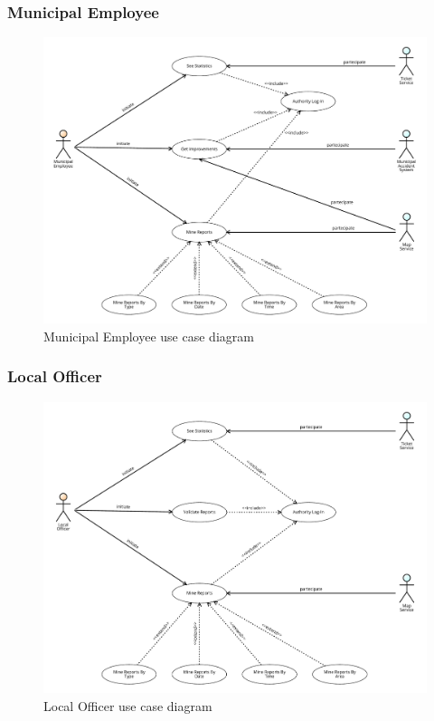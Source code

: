 				\subsubsection{Municipal Employee}
					\vspace{-7mm}
					\begin{figure}[!h]
						\centering
						\includegraphics[width=\textwidth]{images/UseCase/ME.pdf}
						\caption{Municipal Employee use case diagram}
					\end{figure}
				\subsubsection{Local Officer}
				\vspace{-7mm}
					\begin{figure}[!h]
						\centering
						\includegraphics[width=\textwidth]{images/UseCase/LO.pdf}
						\caption{Local Officer use case diagram}
					\end{figure}
			\clearpage
